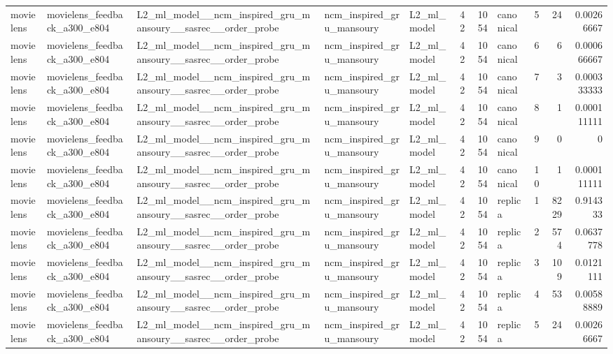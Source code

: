 \begin{table}[htbp!]
\begin{tabular}{lllllrrlrrr}
movielens & movielens\_feedback\_a300\_e804 & L2\_ml\_model\_\_ncm\_inspired\_gru\_mansoury\_\_sasrec\_\_order\_probe & ncm\_inspired\_gru\_mansoury & L2\_ml\_model & 42 & 1054 & canonical & 5 & 24 & 0.00266667 \\
movielens & movielens\_feedback\_a300\_e804 & L2\_ml\_model\_\_ncm\_inspired\_gru\_mansoury\_\_sasrec\_\_order\_probe & ncm\_inspired\_gru\_mansoury & L2\_ml\_model & 42 & 1054 & canonical & 6 & 6 & 0.000666667 \\
movielens & movielens\_feedback\_a300\_e804 & L2\_ml\_model\_\_ncm\_inspired\_gru\_mansoury\_\_sasrec\_\_order\_probe & ncm\_inspired\_gru\_mansoury & L2\_ml\_model & 42 & 1054 & canonical & 7 & 3 & 0.000333333 \\
movielens & movielens\_feedback\_a300\_e804 & L2\_ml\_model\_\_ncm\_inspired\_gru\_mansoury\_\_sasrec\_\_order\_probe & ncm\_inspired\_gru\_mansoury & L2\_ml\_model & 42 & 1054 & canonical & 8 & 1 & 0.000111111 \\
movielens & movielens\_feedback\_a300\_e804 & L2\_ml\_model\_\_ncm\_inspired\_gru\_mansoury\_\_sasrec\_\_order\_probe & ncm\_inspired\_gru\_mansoury & L2\_ml\_model & 42 & 1054 & canonical & 9 & 0 & 0 \\
movielens & movielens\_feedback\_a300\_e804 & L2\_ml\_model\_\_ncm\_inspired\_gru\_mansoury\_\_sasrec\_\_order\_probe & ncm\_inspired\_gru\_mansoury & L2\_ml\_model & 42 & 1054 & canonical & 10 & 1 & 0.000111111 \\
movielens & movielens\_feedback\_a300\_e804 & L2\_ml\_model\_\_ncm\_inspired\_gru\_mansoury\_\_sasrec\_\_order\_probe & ncm\_inspired\_gru\_mansoury & L2\_ml\_model & 42 & 1054 & replica & 1 & 8229 & 0.914333 \\
movielens & movielens\_feedback\_a300\_e804 & L2\_ml\_model\_\_ncm\_inspired\_gru\_mansoury\_\_sasrec\_\_order\_probe & ncm\_inspired\_gru\_mansoury & L2\_ml\_model & 42 & 1054 & replica & 2 & 574 & 0.0637778 \\
movielens & movielens\_feedback\_a300\_e804 & L2\_ml\_model\_\_ncm\_inspired\_gru\_mansoury\_\_sasrec\_\_order\_probe & ncm\_inspired\_gru\_mansoury & L2\_ml\_model & 42 & 1054 & replica & 3 & 109 & 0.0121111 \\
movielens & movielens\_feedback\_a300\_e804 & L2\_ml\_model\_\_ncm\_inspired\_gru\_mansoury\_\_sasrec\_\_order\_probe & ncm\_inspired\_gru\_mansoury & L2\_ml\_model & 42 & 1054 & replica & 4 & 53 & 0.00588889 \\
movielens & movielens\_feedback\_a300\_e804 & L2\_ml\_model\_\_ncm\_inspired\_gru\_mansoury\_\_sasrec\_\_order\_probe & ncm\_inspired\_gru\_mansoury & L2\_ml\_model & 42 & 1054 & replica & 5 & 24 & 0.00266667 \\

\end{tabular}
\end{table}
